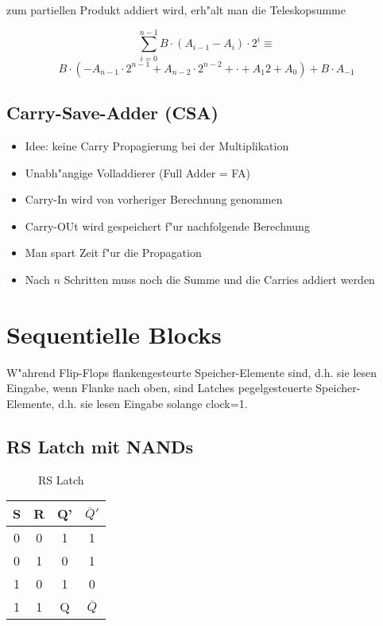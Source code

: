 \documentclass[german, 10pt, a4paper, twocolumn]{scrartcl}
\theoremstyle{definition}
\begin{document}
zum partiellen Produkt addiert wird, erh"alt man die Teleskopsumme

\begin{displaymath}
	\sum^{n-1}_{i=0} B \cdotp (A_{i-1} - A_i)\cdotp 2^i \equiv
\end{displaymath}
\begin{displaymath}
	B \cdotp (- A_{n-1} \cdotp 2^{n-1} + A_{n-2}\cdotp 2^{n-2}+\cdotp + A_1 2 + A_0)+ B\cdotp A_{-1}
\end{displaymath}

\subsection{Carry-Save-Adder (CSA)}

\begin{itemize}
	\item Idee: keine Carry Propagierung bei der Multiplikation
	\item Unabh"angige Volladdierer (Full Adder = FA)
	\item Carry-In wird von vorheriger Berechnung genommen
	\item Carry-OUt wird gespeichert f"ur nachfolgende Berechnung
	\item Man spart Zeit f"ur die Propagation
	\item Nach $n$ Schritten muss noch die Summe und die Carries addiert werden
\end{itemize}

\section{Sequentielle Blocks}

W"ahrend Flip-Flops flankengesteurte Speicher-Elemente sind, d.h. sie lesen Eingabe, wenn Flanke nach oben, sind Latches pegelgesteuerte Speicher-Elemente, d.h. sie lesen Eingabe solange clock=1.

\subsection{RS Latch mit NANDs}

\begin{figure}[hbt]
 
 \centerline{\box\graph}
 \caption{RS Latch}
 \label{rs_latch}
\end{figure}

\begin{tabular}{cc|cc}
	S &	R &	Q' &	$\overline{Q}'$ \\ \hline
	0 &	0 &	1 &	1 \\
	0 &	1 &	0 &	1 \\
	1 &	0 &	1 &	0 \\
	1 &	1 &	Q &	$\overline{Q}$ \\
\end{tabular}
\end{document}

